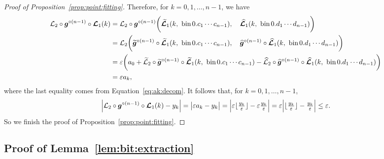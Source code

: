 \documentclass[nohyperref]{article}
\theoremstyle{plain}
\theoremstyle{definition}
\theoremstyle{remark}
\begin{document}
\begin{proof}[Proof of Proposition~\ref{prop:point:fitting}]
	Therefore, for $k=0,1,\dotsc,n-1$, we have
	\begin{equation*}
		\begin{split}
			\calL_2\circ \bmg^{\circ (n-1)}\circ \bmcalL_1(k)
			&= \calL_2\circ \bmg^{\circ (n-1)}\bigg(\bmtildecalL_1(k, \  \bin 0.c_1\cdots c_{n-1})
			,\quad
			\bmhatcalL_1(k, \  \bin 0.d_1\cdots d_{n-1})\bigg)\\
			&=\calL_2\bigg(\bmtildeg^{\circ (n-1)}\circ\bmtildecalL_1(k, \  \bin 0.c_1\cdots c_{n-1})
			,\quad
			\bmhatg^{\circ (n-1)}\circ\bmhatcalL_1(k, \  \bin 0.d_1\cdots d_{n-1})\bigg)\\
			&= \eps \bigg(a_0 + \tildecalL_2\circ \bmtildeg^{\circ (n-1)}\circ\bmtildecalL_1(k, \  \bin 0.c_1\cdots c_{n-1})
			-
			\hatcalL_2\circ\bmhatg^{\circ (n-1)}\circ\bmhatcalL_1(k, \  \bin 0.d_1\cdots d_{n-1})\bigg)\\
			&=\eps  a_k,
		\end{split}
	\end{equation*}
	where the last equality comes from
	Equation~\eqref{eq:ak:decom}. It follows that, for $k=0,1,\dotsc,n-1$, 
	\begin{equation*}
		\Big|\calL_2\circ \bmg^{\circ (n-1)}\circ \bmcalL_1(k)-y_k\Big|
		=\big|\eps   a_k - y_k\big|
		=\Big| \eps \lfloor \tfrac{y_k}{\eps}\rfloor  - \eps \tfrac{ y_k}{\eps}\Big|
		=\eps \Big| \lfloor \tfrac{y_k}{\eps}\rfloor  - \tfrac{ y_k}{\eps} \Big|\le \eps.
	\end{equation*}
	So we finish the proof of Proposition~\ref{prop:point:fitting}.
\end{proof}


\subsection{Proof of Lemma~\ref{lem:bit:extraction}}
\label{sec:proof:lem:bit:extraction}
\end{document}
